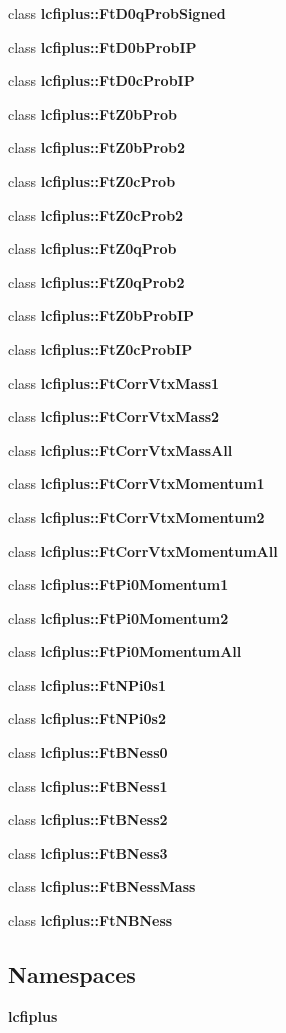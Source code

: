 \begin{DoxyCompactItemize}
\item 
class \textbf{ lcfiplus\+::\+Ft\+D0q\+Prob\+Signed}
\item 
class \textbf{ lcfiplus\+::\+Ft\+D0b\+Prob\+IP}
\item 
class \textbf{ lcfiplus\+::\+Ft\+D0c\+Prob\+IP}
\item 
class \textbf{ lcfiplus\+::\+Ft\+Z0b\+Prob}
\item 
class \textbf{ lcfiplus\+::\+Ft\+Z0b\+Prob2}
\item 
class \textbf{ lcfiplus\+::\+Ft\+Z0c\+Prob}
\item 
class \textbf{ lcfiplus\+::\+Ft\+Z0c\+Prob2}
\item 
class \textbf{ lcfiplus\+::\+Ft\+Z0q\+Prob}
\item 
class \textbf{ lcfiplus\+::\+Ft\+Z0q\+Prob2}
\item 
class \textbf{ lcfiplus\+::\+Ft\+Z0b\+Prob\+IP}
\item 
class \textbf{ lcfiplus\+::\+Ft\+Z0c\+Prob\+IP}
\item 
class \textbf{ lcfiplus\+::\+Ft\+Corr\+Vtx\+Mass1}
\item 
class \textbf{ lcfiplus\+::\+Ft\+Corr\+Vtx\+Mass2}
\item 
class \textbf{ lcfiplus\+::\+Ft\+Corr\+Vtx\+Mass\+All}
\item 
class \textbf{ lcfiplus\+::\+Ft\+Corr\+Vtx\+Momentum1}
\item 
class \textbf{ lcfiplus\+::\+Ft\+Corr\+Vtx\+Momentum2}
\item 
class \textbf{ lcfiplus\+::\+Ft\+Corr\+Vtx\+Momentum\+All}
\item 
class \textbf{ lcfiplus\+::\+Ft\+Pi0\+Momentum1}
\item 
class \textbf{ lcfiplus\+::\+Ft\+Pi0\+Momentum2}
\item 
class \textbf{ lcfiplus\+::\+Ft\+Pi0\+Momentum\+All}
\item 
class \textbf{ lcfiplus\+::\+Ft\+N\+Pi0s1}
\item 
class \textbf{ lcfiplus\+::\+Ft\+N\+Pi0s2}
\item 
class \textbf{ lcfiplus\+::\+Ft\+B\+Ness0}
\item 
class \textbf{ lcfiplus\+::\+Ft\+B\+Ness1}
\item 
class \textbf{ lcfiplus\+::\+Ft\+B\+Ness2}
\item 
class \textbf{ lcfiplus\+::\+Ft\+B\+Ness3}
\item 
class \textbf{ lcfiplus\+::\+Ft\+B\+Ness\+Mass}
\item 
class \textbf{ lcfiplus\+::\+Ft\+N\+B\+Ness}
\end{DoxyCompactItemize}
\subsection*{Namespaces}
\begin{DoxyCompactItemize}
\item 
 \textbf{ lcfiplus}
\end{DoxyCompactItemize}

